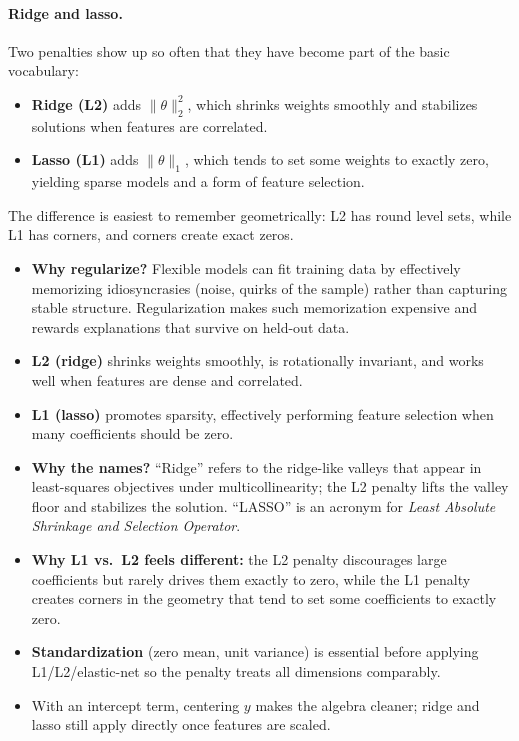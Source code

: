 \paragraph{Ridge and lasso.}
Two penalties show up so often that they have become part of the basic vocabulary:
\begin{itemize}
    \item \textbf{Ridge (L2)} adds \(\|\theta\|_2^2\), which shrinks weights smoothly and stabilizes solutions when features are correlated.
    \item \textbf{Lasso (L1)} adds \(\|\theta\|_1\), which tends to set some weights to exactly zero, yielding sparse models and a form of feature selection.
\end{itemize}
The difference is easiest to remember geometrically: L2 has round level sets, while L1 has corners, and corners create exact zeros.

\begin{tcolorbox}[summarybox, title={Regularization: L1/L2 and scaling}]
\begin{itemize}
    \item \textbf{Why regularize?} Flexible models can fit training data by effectively memorizing idiosyncrasies (noise, quirks of the sample) rather than capturing stable structure. Regularization makes such memorization expensive and rewards explanations that survive on held-out data.
    \item \textbf{L2 (ridge)} shrinks weights smoothly, is rotationally invariant, and works well when features are dense and correlated.
    \item \textbf{L1 (lasso)} promotes sparsity, effectively performing feature selection when many coefficients should be zero.
    \item \textbf{Why the names?} ``Ridge'' refers to the ridge-like valleys that appear in least-squares objectives under multicollinearity; the L2 penalty lifts the valley floor and stabilizes the solution. ``LASSO'' is an acronym for \emph{Least Absolute Shrinkage and Selection Operator}.
    \item \textbf{Why L1 vs.\ L2 feels different:} the L2 penalty discourages large coefficients but rarely drives them exactly to zero, while the L1 penalty creates corners in the geometry that tend to set some coefficients to exactly zero.
    \item \textbf{Standardization} (zero mean, unit variance) is essential before applying L1/L2/elastic-net so the penalty treats all dimensions comparably.
    \item With an intercept term, centering \(y\) makes the algebra cleaner; ridge and lasso still apply directly once features are scaled.
\end{itemize}
\end{tcolorbox}


